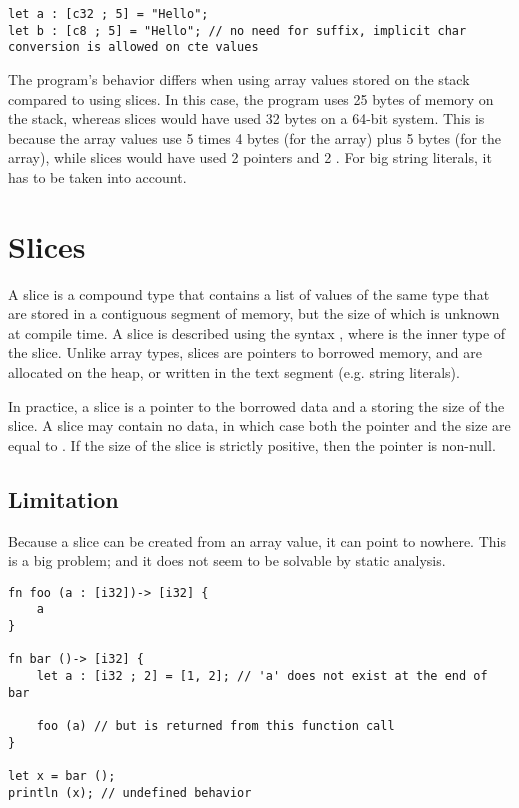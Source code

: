 \begin{lstlisting}[style=coloredverbatim]
let a : [c32 ; 5] = "Hello";
let b : [c8 ; 5] = "Hello"; // no need for suffix, implicit char conversion is allowed on cte values
\end{lstlisting}

The program's behavior differs when using array values stored on the stack
compared to using slices. In this case, the program uses 25 bytes of memory on
the stack, whereas slices would have used 32 bytes on a 64-bit system. This is
because the array values use 5 times 4 bytes (for the  array) plus 5
bytes (for the  array), while slices would have used 2 pointers and 2
. For big string literals, it has to be taken into account.

\vfill%
\pagebreak

\section{Slices}%
\label{sec:slices}

A slice is a compound type that contains a list of values of the same type that
are stored in a contiguous segment of memory, but the size of which is unknown
at compile time. A slice is described using the syntax \token{[T]}, where
 is the inner type of the slice. Unlike array types, slices are
pointers to borrowed memory, and are allocated on the heap, or written in the
text segment (e.g. string literals).

In practice, a slice is a pointer  to the borrowed data and a
 storing the size of the slice. A slice may contain no data, in
which case both the pointer and the size are equal to . If the size of
the slice is strictly positive, then the pointer is non-null.




\subsection{Limitation}%
\label{sec:slice_lim}

Because a slice can be created from an array value, it can point to nowhere.
This is a big problem; and it does not seem to be solvable by static analysis.

\begin{lstlisting}[style=coloredverbatim]
fn foo (a : [i32])-> [i32] {
    a
}

fn bar ()-> [i32] {
    let a : [i32 ; 2] = [1, 2]; // 'a' does not exist at the end of bar

    foo (a) // but is returned from this function call
}

let x = bar ();
println (x); // undefined behavior
\end{lstlisting}

